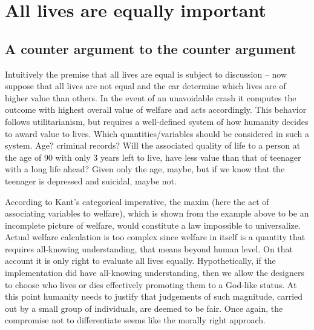 \section{All lives are equally important}
\subsection{A counter argument to the counter argument}
Intuitively the premise that all lives are equal is subject to discussion --
now suppose that all lives are not equal and the car determine which lives
are of higher value than others. In the event of an unavoidable crash it
computes the outcome with highest overall value of welfare and acts accordingly.
This behavior follows utilitarianism, but requires a well-defined system of
how humanity decides to award value to lives. Which quantities/variables should be
considered in such a system. Age? criminal records?
Will the associated quality of life to a person at the age of 90 with only 3 years left to live,
have less value than that of teenager with a long life ahead? Given only the age, maybe, but if we
know that the teenager is depressed and suicidal, maybe not.

According to Kant's categorical imperative, the maxim (here the act of associating variables to welfare),
which is shown from the example above to be an incomplete picture of welfare,
would constitute a law impossible to universalize.
Actual welfare calculation is too complex since welfare in itself is a quantity
that requires all-knowing understanding, that means beyond human level.
On that account it is only right to evaluate all lives equally.
Hypothetically, if the implementation did have all-knowing understanding, then we
allow the designers to choose who lives or dies effectively promoting them to
a God-like status. At this point humanity needs to justify that judgements of such magnitude,
carried out by a small group of individuals, are deemed to be fair.
Once again, the compromise not to differentiate seems like the morally right approach.
